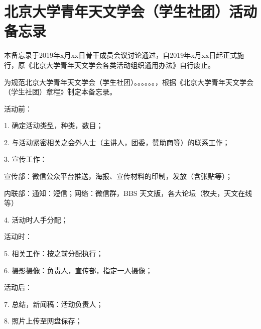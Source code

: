 \chapter{北京大学青年天文学会（学生社团）活动备忘录}

本备忘录于2019年x月xx日骨干成员会议讨论通过，自2019年x月xx日起正式施行，原《北京大学青年天文学会各类活动组织通用办法》自行废止。

为规范北京大学青年天文学会（学生社团）。。。。。。，根据《北京大学青年天文学会（学生社团）章程》制定本备忘录。

活动前：

1. 确定活动类型，种类，数目；

2. 与活动紧密相关之会外人士（主讲人，团委，赞助商等）的联系工作；

3. 宣传工作：

宣传部：微信公众平台推送，海报、宣传材料的印制，发放（含张贴等）；

内联部：通知：短信；网络：微信群，BBS 天文版，各大论坛（牧夫，天文在线等）

4. 活动时人手分配；

活动时：

5. 相关工作：按之前分配执行；

6. 摄影摄像：负责人，宣传部，指定一人摄像；

活动后：

7. 总结，新闻稿：活动负责人；

8. 照片上传至网盘保存；
